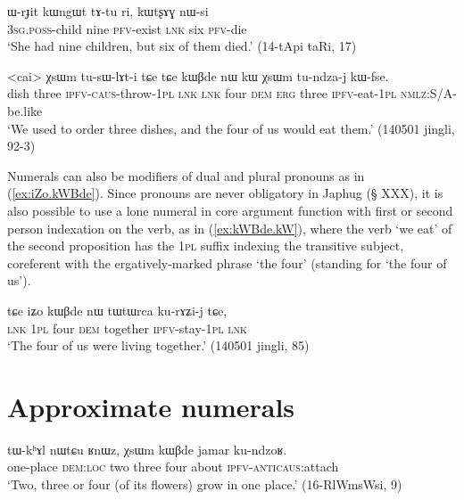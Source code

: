 \begin{exe}
\ex \label{ex:WrJit.kWngWt} 
\gll
ɯ-rɟit kɯngɯt tɤ-tu ri, kɯtʂɤɣ nɯ-si \\
\textsc{3sg.poss}-child nine \textsc{pfv}-exist \textsc{lnk} six \textsc{pfv}-die \\
\glt `She had nine children, but six of them died.' (14-tApi taRi, 17)
\end{exe}

\begin{exe}
\ex \label{ex:kWBde.kW} 
\gll <cai> χsɯm tu-sɯ-lɤt-i tɕe tɕe  kɯβde nɯ kɯ χsɯm tu-ndza-j kɯ-fse. \\
dish three \textsc{ipfv}-\textsc{caus}-throw-\textsc{1pl} \textsc{lnk} \textsc{lnk} four \textsc{dem} \textsc{erg} three \textsc{ipfv}-eat-\textsc{1pl} \textsc{nmlz}:S/A-be.like \\
\glt `We used to order three dishes, and the four of us would eat them.' (140501 jingli, 92-3)
\end{exe}		

Numerals can also be modifiers of dual and plural pronouns as in (\ref{ex:iZo.kWBde}). Since pronouns are never obligatory in Japhug (§ XXX), it is also possible to use a lone numeral in core argument function with first or second person indexation on the verb, as in (\ref{ex:kWBde.kW}), where the verb  `we eat' of the second proposition has the \textsc{1pl}  suffix indexing the transitive subject, coreferent with the ergatively-marked phrase  `the four' (standing for  `the four of us').

\begin{exe}
\ex \label{ex:iZo.kWBde} 
\gll tɕe iʑo kɯβde nɯ tɯtɯrca ku-rɤʑi-j tɕe, \\
\textsc{lnk} \textsc{1pl} four \textsc{dem}  together \textsc{ipfv}-stay-\textsc{1pl} \textsc{lnk} \\
\glt `The four of us were living together.' (140501 jingli, 85)
\end{exe}		
 
\section{Approximate numerals} \label{sec:approx.numerals}

\begin{exe}
\ex \label{ex:RnWz.XsWm.kWBde}
\gll tɯ-kʰɤl nɯtɕu ʁnɯz, χsɯm kɯβde jamar ku-ndzoʁ. \\
one-place \textsc{dem}:\textsc{loc} two three four about \textsc{ipfv}-\textsc{anticaus}:attach \\
\glt `Two, three or four (of its flowers) grow in one place.' (16-RlWmsWsi, 9)
\end{exe}

